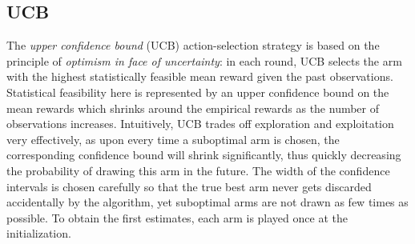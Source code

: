 \documentclass[10pt,journal,compsoc]{IEEEtran}
\begin{document}
	
	\subsection{UCB}
	\label{section:bandits_ucb}		
	The \emph{upper confidence bound} (UCB) action-selection strategy \cite{Agr95,BuKa96,auer2002finite} is based on the principle of \emph{optimism in face of uncertainty}: in each round, UCB selects the arm with the highest statistically feasible mean reward given the past observations. Statistical feasibility here is represented by an upper confidence bound on the mean rewards which shrinks around the empirical rewards as the number of observations increases. Intuitively, UCB trades off exploration and exploitation very effectively, as upon every time a suboptimal arm is chosen, the corresponding confidence bound will shrink significantly, thus quickly decreasing the probability of drawing this arm in the future. The width of the confidence intervals is chosen carefully so that the true best arm never gets discarded accidentally by the algorithm, yet suboptimal arms are not drawn as few times as possible. To obtain the first estimates, each arm is played once at the initialization. 
	
\end{document}
